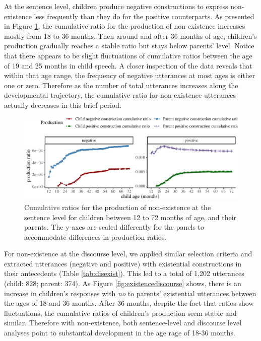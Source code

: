 \documentclass[
  man,floatsintext]{apa6}
\begin{document}
At the sentence level, children produce negative constructions to express non-existence less frequently than they do for the positive counterparts. As presented in Figure \ref{fig:existence}, the cumulative ratio for the production of non-existence increases mostly from 18 to 36 months. Then around and after 36 months of age, children's production gradually reaches a stable ratio but stays below parents' level. Notice that there appears to be slight fluctuations of cumulative ratios between the age of 19 and 25 months in child speech. A closer inspection of the data reveals that within that age range, the frequency of negative utterances at most ages is either one or zero. Therefore as the number of total utterances increases along the developmental trajectory, the cumulative ratio for non-existence utterances actually decreases in this brief period.

\begin{figure}[H]

{\centering \includegraphics{neg_construction_article_files/figure-latex/existence-1} 

}

\caption{Cumulative ratios for the production of non-existence at the sentence level for children between 12 to 72 months of age, and their parents. The y-axes are scaled differently for the panels to accommodate differences in production ratios.}\label{fig:existence}
\end{figure}

For non-existence at the discourse level, we applied similar selection criteria and extracted utterances (negative and positive) with existential constructions in their antecedents (Table \ref{tab:disexist}). This led to a total of 1,202 utterances (child: 828; parent: 374). As Figure \ref{fig:existencediscourse} shows, there is an increase in children's responses with \emph{no} to parents' existential utterances between the ages of 18 and 36 months. After 36 months, despite the fact that ratios show fluctuations, the cumulative ratios of children's production seem stable and similar. Therefore with non-existence, both sentence-level and discourse level analyses point to substantial development in the age rage of 18-36 months.
\end{document}
